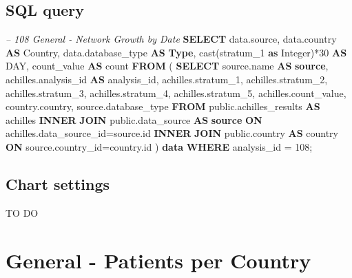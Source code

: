 \documentclass[]{book}
\newenvironment{Shaded}{\begin{snugshade}}{\end{snugshade}}
\newcommand{\KeywordTok}[1]{\textcolor[rgb]{0.13,0.29,0.53}{\textbf{#1}}}
\newcommand{\DataTypeTok}[1]{\textcolor[rgb]{0.13,0.29,0.53}{#1}}
\newcommand{\DecValTok}[1]{\textcolor[rgb]{0.00,0.00,0.81}{#1}}
\newcommand{\CommentTok}[1]{\textcolor[rgb]{0.56,0.35,0.01}{\textit{#1}}}
\newcommand{\FunctionTok}[1]{\textcolor[rgb]{0.00,0.00,0.00}{#1}}
\newcommand{\NormalTok}[1]{#1}
\begin{document}
\subsection{SQL query}\label{sql-query-4}

\begin{Shaded}
\begin{Highlighting}[]
\CommentTok{-- 108    General - Network Growth by Date}
\KeywordTok{SELECT}\NormalTok{ data.source,}
\NormalTok{       data.country }\KeywordTok{AS}\NormalTok{ Country,}
\NormalTok{       data.database_type }\KeywordTok{AS} \KeywordTok{Type}\NormalTok{,}
       \FunctionTok{cast}\NormalTok{(stratum_1 }\KeywordTok{as} \DataTypeTok{Integer}\NormalTok{)*}\DecValTok{30} \KeywordTok{AS} \DataTypeTok{DAY}\NormalTok{,}
\NormalTok{       count_value                   }\KeywordTok{AS} \FunctionTok{count}
\KeywordTok{FROM}\NormalTok{ (}
     \KeywordTok{SELECT}\NormalTok{ source.name              }\KeywordTok{AS} \KeywordTok{source}\NormalTok{,}
\NormalTok{            achilles.analysis_id     }\KeywordTok{AS}\NormalTok{ analysis_id,}
\NormalTok{            achilles.stratum_1,}
\NormalTok{            achilles.stratum_2,}
\NormalTok{            achilles.stratum_3,}
\NormalTok{            achilles.stratum_4,}
\NormalTok{            achilles.stratum_5,}
\NormalTok{            achilles.count_value,}
\NormalTok{            country.country,}
\NormalTok{            source.database_type}
     \KeywordTok{FROM}\NormalTok{ public.achilles_results }\KeywordTok{AS}\NormalTok{ achilles }\KeywordTok{INNER} \KeywordTok{JOIN} 
\NormalTok{        public.data_source }\KeywordTok{AS} \KeywordTok{source} \KeywordTok{ON} 
\NormalTok{        achilles.data_source_id=source.id}
     \KeywordTok{INNER} \KeywordTok{JOIN}\NormalTok{ public.country }\KeywordTok{AS}\NormalTok{ country }\KeywordTok{ON} 
\NormalTok{        source.country_id=country.id}
\NormalTok{     ) }\KeywordTok{data}
\KeywordTok{WHERE}\NormalTok{ analysis_id = }\DecValTok{108}\NormalTok{;}
\end{Highlighting}
\end{Shaded}

\subsection{Chart settings}\label{chart-settings-4}

TO DO

\section{General - Patients per
Country}\label{general---patients-per-country}
\end{document}
